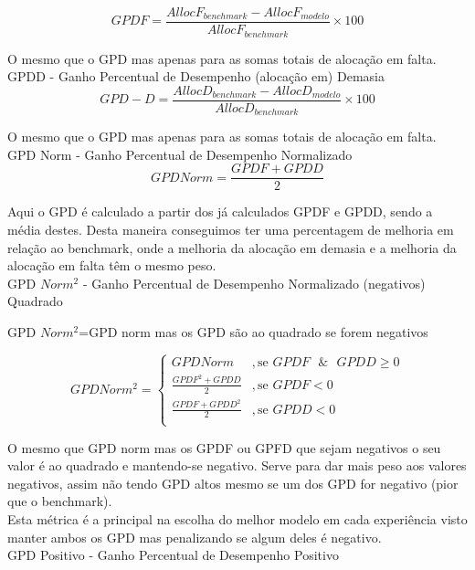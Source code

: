 \begin{equation} \label{eq:gpdf} 
    GPDF = \frac{AllocF_{benchmark} - AllocF_{modelo}}{AllocF_{benchmark}} \times 100
\end{equation}
\smallskip

O mesmo que o GPD mas apenas para as somas totais de alocação em falta.\\
\bigskip
GPDD - Ganho Percentual de Desempenho (alocação em) Demasia\\

\begin{equation} \label{eq:gpdd} 
    GPD-D = \frac{AllocD_{benchmark} - AllocD_{modelo}}{AllocD_{benchmark}} \times 100
\end{equation}
\smallskip

O mesmo que o GPD mas apenas para as somas totais de alocação em falta.\\
\bigskip
GPD Norm - Ganho Percentual de Desempenho Normalizado \\

\begin{equation} \label{eq:gpdnorm} 
    GPD Norm = \frac{GPDF + GPDD}{2}
\end{equation}
\smallskip

Aqui o GPD é calculado a partir dos já calculados GPDF e GPDD, sendo a média destes. Desta maneira conseguimos ter uma percentagem de melhoria em relação ao benchmark, onde a melhoria da alocação em demasia e a melhoria da alocação em falta têm o mesmo peso. \\

\bigskip
GPD $Norm^{2}$ - Ganho Percentual de Desempenho Normalizado (negativos) Quadrado

 GPD $Norm^{2}$=GPD norm mas os GPD são ao quadrado se forem negativos  


 \begin{equation} \label{eq:gpdnorm2} 
    GPD Norm^{2} = 
    \begin{cases} 
        GPD Norm & , \text{se } GPDF \text{ }\&\text{ } GPDD \geq 0 \\
        \frac{GPDF^{2} + GPDD}{2} & , \text{se } GPDF  < 0 \\
        \frac{GPDF + GPDD^{2}}{2} & , \text{se } GPDD < 0 \\
    \end{cases} 
\end{equation}
\smallskip


O mesmo que GPD norm mas os GPDF ou GPFD que sejam negativos o seu valor é ao quadrado e mantendo-se negativo. Serve para dar mais peso aos valores negativos, assim não tendo GPD altos mesmo se um dos GPD for negativo (pior que o benchmark). \\
Esta métrica é a principal na escolha do melhor modelo em cada experiência visto manter ambos os GPD mas penalizando se algum deles é negativo. \\
\bigskip
GPD Positivo  - Ganho Percentual de Desempenho Positivo

